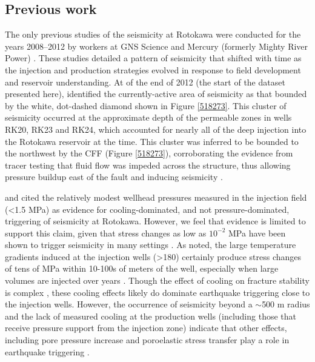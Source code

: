 \subsection{Previous work}
The only previous studies of the seismicity at Rotokawa were conducted for the years 2008--2012 by workers at GNS Science and Mercury (formerly Mighty River Power) \citep{Sherburn_2015,Sewell_2015WGC}. These studies detailed a pattern of seismicity that shifted with time as the injection and production strategies evolved in response to field development and reservoir understanding. At of the end of 2012 (the start of the dataset presented here), \citet{Sherburn_2015} identified the currently-active area of seismicity as that bounded by the white, dot-dashed diamond shown in Figure \ref{518273}. This cluster of seismicity occurred at the approximate depth of the permeable zones in wells RK20, RK23 and RK24, which accounted for nearly all of the deep injection into the Rotokawa reservoir at the time. This cluster was inferred to be bounded to the northwest by the CFF (Figure \ref{518273}), corroborating the evidence from tracer testing that fluid flow was impeded across the structure, thus allowing pressure buildup east of the fault and inducing seismicity \citep{Sherburn_2015,Sewell_2015WGC}. 

\citet{Sherburn_2015} and \citet{Sewell_2015WGC} cited the relatively modest wellhead pressures measured in the injection field (\textless1.5 MPa) as evidence for cooling-dominated, and not pressure-dominated, triggering of seismicity at Rotokawa. However, we feel that evidence is limited to support this claim, given that stress changes as low as $10^{-2}$ MPa have been shown to trigger seismicity in many settings \citep[][]{stein1999role,keranen2018induced}. As \citet{Sewell_2015WGC} noted, the large temperature gradients induced at the injection wells (\textgreater180) certainly produce stress changes of tens of MPa within 10-100s of meters of the well, especially when large volumes are injected over years \citep{stephens1982hydraulic}. Though the effect of cooling on fracture stability is complex \citep{Jeanne_2015deformation}, these cooling effects likely do dominate earthquake triggering close to the injection wells. However, the occurrence of seismicity beyond a $\sim${500} m radius and the lack of measured cooling at the production wells (including those that receive pressure support from the injection zone) indicate that other effects, including pore pressure increase and poroelastic stress transfer play a role in earthquake triggering \citep{Schoenball_2012}.

